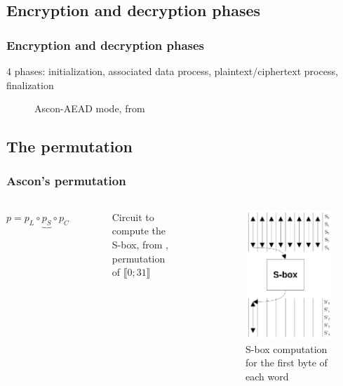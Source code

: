 \documentclass{beamer}
\begin{document}
	\subsection{Encryption and decryption phases}
	\begin{frame}
		\frametitle{Encryption and decryption phases}
		
		4 phases: initialization, associated data process, plaintext/ciphertext process, finalization
		
		\begin{figure}
			\centering
			\resizebox{350pt}{80pt}{
				
			}
			\caption{Ascon-AEAD mode, from \cite{cours_crypto}}
		\end{figure}	
	\end{frame}
	
	\subsection{The permutation}
	\begin{frame}
		\frametitle{Ascon's permutation}
		
		\begin{columns}
			\column{0.47\textwidth}
			$p = p_L \circ \underbrace{p_S}{} \circ p_C$\\
			\begin{figure}
				\resizebox*{150pt}{90pt}{
					
				}
				\caption{Circuit to compute the S-box, from \cite{crypto_schema}, permutation of $\llbracket0;31 \rrbracket$}
				\label{circuit_sbox}
			\end{figure}
			
			\column{0.47\textwidth}
			\begin{figure}[h]
				\centering
				\includegraphics[width=0.6\linewidth]{img_files/sbox_illustration}
				\caption{S-box computation for the first byte of each word}
				\label{fig:comp}
			\end{figure}

		\end{columns}
	\end{frame}
	
\end{document}
